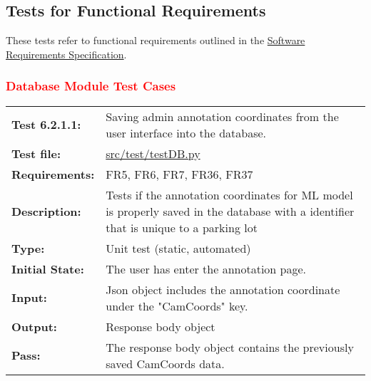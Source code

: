 \documentclass[12pt, titlepage]{article}
\begin{document}

\subsection{Tests for Functional Requirements}
These tests refer to functional requirements outlined in the
\href{https://github.com/parkd-app/park-d/blob/main/docs/SRS/SRS.pdf}{Software
Requirements Specification}. \subsubsection{\textcolor{red}{Database Module Test
Cases}} \textcolor{red}{
\vspace{0.5cm}
\hspace{0.5cm}
\begin{tabular}{|l|p{10cm}|}
    \hline
    \bf{Test} 6.2.1.1: & Saving admin annotation coordinates from the user
    interface into the database. \\
     \bf{Test file: } &
     \href{https://github.com/parkd-app/park-d/blob/main/test/TestDB.py}{src/test/testDB.py}\\
    \bf{Requirements}: &  FR5, FR6, FR7, FR36, FR37\\
    \bf{Description}: & Tests if the annotation coordinates for ML model is
    properly saved in the database with a identifier that is unique to a parking
    lot\\
    \bf{Type}: & Unit test (static, automated) \\
    \bf{Initial State}: & The user has enter the annotation page. \\
    \bf{Input}: & Json object includes the annotation coordinate under the
    "CamCoords" key. \\
    \bf{Output}: & Response body object \\
    \bf{Pass}: & The response body object contains the previously saved
    CamCoords data. \\
    \hline
\end{tabular}}


\vspace*{0.5 cm}
\end{document}
